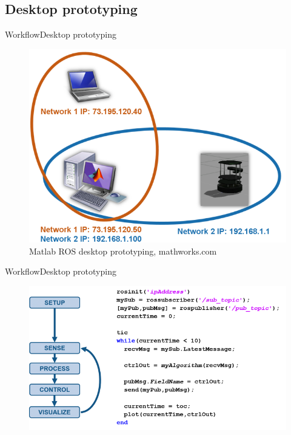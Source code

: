 \documentclass{beamer}
\begin{document}
\subsection{Desktop prototyping}
\begin{frame}{Workflow}{Desktop prototyping}
\begin{figure}
\includegraphics[scale=0.3]{figs/img/desktopproto.png}
\caption{Matlab ROS desktop prototyping, mathworks.com}
\end{figure}
\end{frame}
\begin{frame}{Workflow}{Desktop prototyping}
\begin{figure}
\includegraphics[scale=0.4]{figs/img/desktopproto2.png}
\end{figure}
\end{frame}
\end{document}
